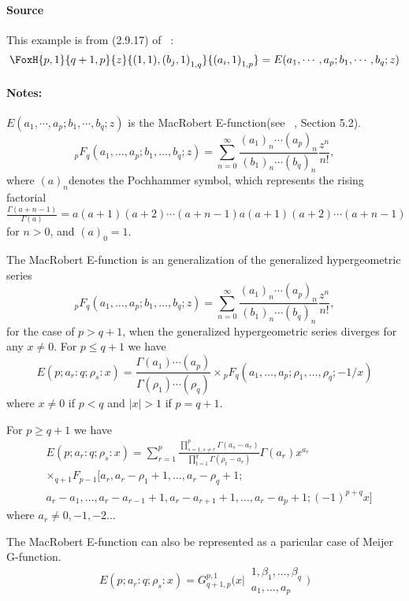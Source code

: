 \paragraph{Source} This example is from (2.9.17) of
~\cite{kilbas.saigo:04:h-transforms}:
\begin{align*}
  \FoxH
    {p,1}
    {q+1,p}
    {z}
    {(1,1), \left(b_j, 1\right)_{1,q}}
    {\left(a_i, 1\right)_{1,p}}=E(a_1,\cdots, a_p;b_1,\cdots, b_q;z)
\end{align*}
\paragraph{Notes:}
$E(a_1,\cdots, a_p;b_1,\cdots, b_q;z)$ is the MacRobert E-function(see ~\cite{erdelyi.magnus.ea:81:higher*1}, Section 5.2).
$${}_pF_q(a_1, \ldots, a_p; b_1, \ldots, b_q; z) = \sum_{n=0}^{\infty} \frac{(a_1)_n \cdots (a_p)_n}{(b_1)_n \cdots (b_q)_n} \frac{z^n}{n!},$$
where  $(a)_n$denotes the Pochhammer symbol, which represents the rising factorial $\frac{\Gamma{(a+n-1)}}{\Gamma{(a)}} = a(a+1)(a+2)⋯(a+n−1)a(a+1)(a+2)⋯(a+n−1)$ for $n > 0$, and $(a)_0=1$.

The MacRobert E-function is an generalization of the generalized hypergeometric series
 $${}_pF_q(a_1, \ldots, a_p; b_1, \ldots, b_q; z) = \sum_{n=0}^{\infty} \frac{(a_1)_n \cdots (a_p)_n}{(b_1)_n \cdots (b_q)_n} \frac{z^n}{n!},$$ for the case of $p>q+1$, when the generalized hypergeometric series diverges for any $x\neq 0$.
For $p \leq q+1$ we have
$$
E\left(p ; a_r: q ; \rho_s: x\right)=\frac{\Gamma\left(a_1\right) \cdots\left(a_p\right)}{\Gamma\left(\rho_1\right) \cdots\left(\rho_q\right)} \times{ }_p F_q\left(a_1, \ldots, a_p ; \rho_1, \ldots, \rho_q ;-1 / x\right)
$$
where $x \neq 0$ if $p<q$ and $|x|>1$ if $p=q+1$.

For $p \geq q+1$ we have
$$
\begin{aligned}
&E\left(p ; a_r: q ; \rho_s: x\right)=\sum_{r=1}^p \frac{\prod_{s=1,s\neq r}^p \Gamma\left(a_s-a_r\right)}{\prod_{t=1}^q \Gamma\left(\rho_t-a_r\right)} \Gamma\left(a_r\right) x^{a_r}\\
&\times {}_{q+1} F_{p-1} [a_r, a_r-\rho_1+1, \ldots, a_r-\rho_q+1 ; \\
				     & a_r-a_1, \ldots, a_r-a_{r-1}+1,a_r-a_{r+1}+1,\ldots, a_r-a_p+1 ;(-1)^{p+q} x]
\end{aligned}
$$
where $a_r\neq 0,-1,-2 \ldots$

The MacRobert E-function can also be represented as a paricular case of Meijer G-function.
$$
E\left(p ; a_r: q ; \rho_s: x\right)=G_{q+1, p}^{p, 1}\Biggl(x \Bigg|\, \begin{array}{c} 
1, \beta_1, \ldots, \beta_q  \\
a_1, \ldots, a_p
\end{array}\Biggl)
$$
